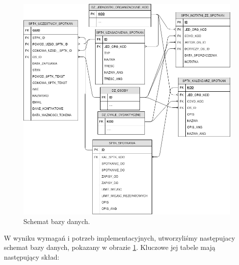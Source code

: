 \documentclass[licencjacka]{pracamgr}
\begin{document}
\begin{figure}[b!]
  \includegraphics[width=\linewidth]{schemat.jpg}
  \caption{Schemat bazy danych.}
  \label{fig:schemat}
\end{figure}

W wyniku wymagań i potrzeb implementacyjnych, utworzyliśmy następujacy schemat bazy danych, pokazany w obrazie \ref{fig:schemat}. Kluczowe jej tabele mają następujący skład:
\end{document}
